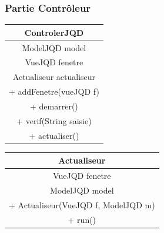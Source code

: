 \documentclass{article}
\begin{document}
\subsubsection{Partie Contrôleur}
\begin{tabular}{|c|}
	\hline
	ControlerJQD\\
	\hline
	ModelJQD model\\
	VueJQD fenetre\\
	Actualiseur actualiseur\\
	\hline
	+ addFenetre(vueJQD f)\\
	+ demarrer()\\
	+ verif(String saisie)\\
	+ actualiser()\\
	\hline
\end{tabular}
\hspace{2cm} \begin{tabular}{|c|}
	 \hline
	 Actualiseur\\
	 \hline
	 VueJQD fenetre\\
	 ModelJQD model\\
	 \hline
	 + Actualiseur(VueJQD f, ModelJQD m)\\
	 + run()\\
	 \hline
 \end{tabular}
\end{document}
